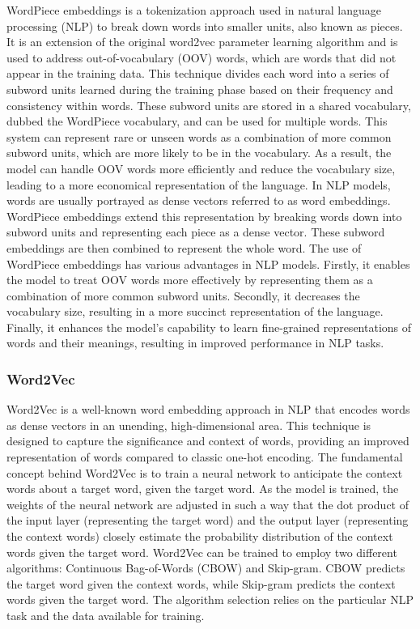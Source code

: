 WordPiece embeddings\cite{DBLP:journals/corr/WuSCLNMKCGMKSJL16} is a tokenization approach used in natural language processing (NLP) to break down words into smaller units, also known as pieces. It is an extension of the original word2vec parameter learning algorithm and is used to address out-of-vocabulary (OOV) words, which are words that did not appear in the training data.
This technique divides each word into a series of subword units learned during the training phase based on their frequency and consistency within words. These subword units are stored in a shared vocabulary, dubbed the WordPiece vocabulary, and can be used for multiple words.
This system can represent rare or unseen words as a combination of more common subword units, which are more likely to be in the vocabulary. As a result, the model can handle OOV words more efficiently and reduce the vocabulary size, leading to a more economical representation of the language.
In NLP models, words are usually portrayed as dense vectors referred to as word embeddings. WordPiece embeddings extend this representation by breaking words down into subword units and representing each piece as a dense vector. These subword embeddings are then combined to represent the whole word.
The use of WordPiece embeddings has various advantages in NLP models. Firstly, it enables the model to treat OOV words more effectively by representing them as a combination of more common subword units. Secondly, it decreases the vocabulary size, resulting in a more succinct representation of the language. Finally, it enhances the model's capability to learn fine-grained representations of words and their meanings, resulting in improved performance in NLP tasks.

\subsubsection{Word2Vec}

Word2Vec\cite{DBLP:journals/corr/Rong14} is a well-known word embedding approach in NLP that encodes words as dense vectors in an unending, high-dimensional area. This technique is designed to capture the significance and context of words, providing an improved representation of words compared to classic one-hot encoding.
The fundamental concept behind Word2Vec is to train a neural network to anticipate the context words about a target word, given the target word. As the model is trained, the weights of the neural network are adjusted in such a way that the dot product of the input layer (representing the target word) and the output layer (representing the context words) closely estimate the probability distribution of the context words given the target word.
Word2Vec can be trained to employ two different algorithms: Continuous Bag-of-Words (CBOW) and Skip-gram. CBOW predicts the target word given the context words, while Skip-gram predicts the context words given the target word. The algorithm selection relies on the particular NLP task and the data available for training.

